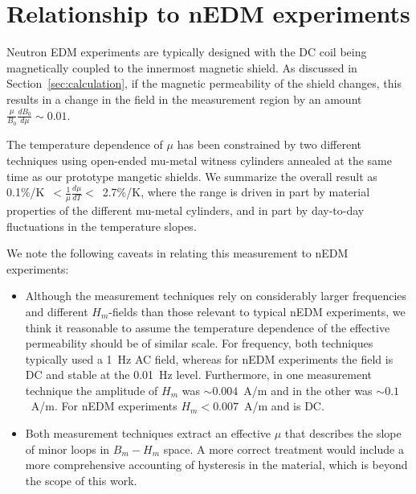 \documentclass[review]{elsarticle}
\begin{document}






\section{Relationship to nEDM experiments}

Neutron EDM experiments are typically designed with the DC coil being
magnetically coupled to the innermost magnetic shield.  As discussed
in Section~\ref{sec:calculation}, if the magnetic permeability of the
shield changes, this results in a change in the field in the
measurement region by an amount $\frac{\mu}{B_0}\frac{dB_0}{d\mu}\sim
0.01$.

The temperature dependence of $\mu$ has been constrained by two
different techniques using open-ended mu-metal witness cylinders
annealed at the same time as our prototype mangetic shields.  We
summarize the overall result as
0.1\%/K~$<\frac{1}{\mu}\frac{d\mu}{dT}<$~2.7\%/K, where the range is
driven in part by material properties of the different mu-metal
cylinders, and in part by day-to-day fluctuations in the temperature
slopes.



We note the following caveats in relating this measurement to nEDM
experiments:
\begin{itemize}
\item Although the measurement techniques rely on considerably larger
  frequencies and different $H_m$-fields than those relevant to
  typical nEDM experiments, we think it reasonable to assume the
  temperature dependence of the effective permeability should be of
  similar scale.  For frequency, both techniques typically used a 1~Hz
  AC field, whereas for nEDM experiments the field is DC and stable at
  the 0.01~Hz level.  Furthermore, in one measurement technique the
  amplitude of $H_m$ was $\sim 0.004$~A/m and in the other was $\sim
  0.1$~A/m.  For nEDM experiments $H_m<0.007$~A/m and is DC.
\item Both measurement techniques extract an effective $\mu$ that
  describes the slope of minor loops in $B_m-H_m$ space.  A more
  correct treatment would include a more comprehensive accounting of
  hysteresis in the material, which is beyond the scope of this work.
\end{itemize}
\end{document}
